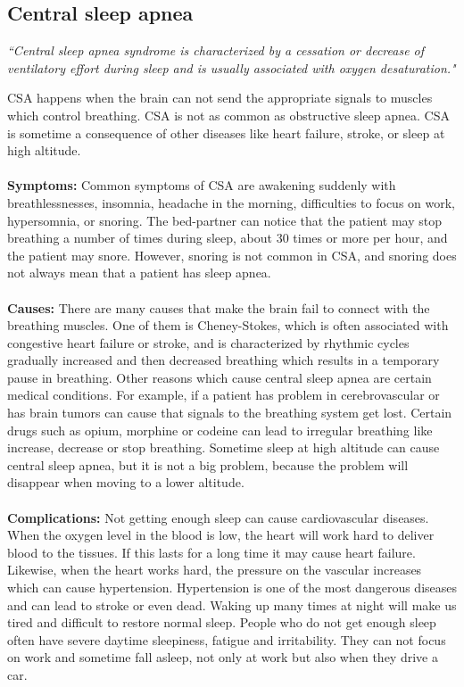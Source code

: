 \subsection{Central sleep apnea}
    \textit{``Central sleep apnea syndrome is characterized by a cessation or decrease of ventilatory effort during sleep and is usually associated with oxygen desaturation."}\citep{Westchester}
    
    CSA happens when the brain can not send the appropriate signals to muscles which control breathing. CSA is not as common as obstructive sleep apnea. CSA is sometime a consequence of other diseases like heart failure, stroke, or sleep at high altitude.\\\\
    \textbf{Symptoms:} Common symptoms of CSA are awakening suddenly with breathlessnesses, insomnia, headache in the morning, difficulties to focus on work, hypersomnia, or snoring. The bed-partner can notice that the patient may stop breathing a number of times during sleep, about 30 times or more per hour, and the patient may snore. However, snoring is not common in CSA, and snoring does not always mean that a patient has sleep apnea.\\\\
    \textbf{Causes:} There are many causes that make the brain fail to connect with the breathing muscles. One of them is Cheney-Stokes, which is often associated with congestive heart failure or stroke, and is characterized by rhythmic cycles gradually increased and then decreased breathing which results in a temporary pause in breathing. 
    Other reasons which cause central sleep apnea are certain medical conditions. For example, if a patient has problem in cerebrovascular or has brain tumors can cause that signals to the breathing system get lost. Certain drugs such as opium, morphine or codeine can lead to irregular breathing like increase, decrease or stop breathing. Sometime sleep at high altitude can cause central sleep apnea, but it is not a big problem, because the problem will disappear when moving to a lower altitude.\\\\
    \textbf{Complications:} Not getting enough sleep can cause cardiovascular diseases. When the oxygen level in the blood is low, the heart will work hard to deliver blood to the tissues. If this lasts for a long time it may cause heart failure. Likewise, when the heart works hard, the pressure on the vascular increases which can cause hypertension. Hypertension is one of the most dangerous diseases and can lead to stroke or even dead. Waking up many times at night will make us tired and difficult to restore normal sleep. People who do not get enough sleep often have severe daytime sleepiness, fatigue and irritability. They can not focus on work and sometime fall asleep, not only at work but also when they drive a car.\\\\
